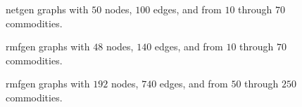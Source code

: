 \begin{figure}
\begin{center}
\mbox{}
\end{center}
\figinfoks
\caption{ {\sc netgen} graphs with
$50$ nodes, $100$ edges, and from $10$ through $70$ commodities. }
\label{fig:k1}
\end{figure}

\begin{figure}
\begin{center}
\mbox{}
\end{center}
\figinfok
\caption{ {\sc rmfgen} graphs with
$48$ nodes, $140$ edges, and from $10$ through $70$ commodities. }
\label{fig:k2}
\end{figure}

\begin{figure}
\begin{center}
\mbox{}
\end{center}
\figinfok
\caption{ {\sc rmfgen} graphs with
$192$ nodes, $740$ edges, and from $50$ through $250$ commodities. }
\label{fig:k3}
\end{figure}


